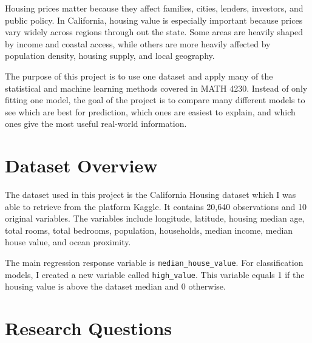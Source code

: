 \documentclass[12pt]{report}
\begin{document}
Housing prices matter because they affect families, cities, lenders, investors, and public policy. In California, housing value is especially important because prices vary widely across regions through out the state. Some areas are heavily shaped by income and coastal access, while others are more heavily affected  by population density, housing supply, and local geography.

The purpose of this project is to use one dataset and apply many of the statistical and machine learning methods covered in MATH 4230. Instead of only fitting one model, the goal of the project is to compare many different models to see which are best for prediction, which ones are easiest to explain, and which ones give the most useful real-world information.

\section{Dataset Overview}

The dataset used in this project is the California Housing dataset which I was able to retrieve from the platform Kaggle. It contains 20,640 observations and 10 original variables. The variables include longitude, latitude, housing median age, total rooms, total bedrooms, population, households, median income, median house value, and ocean proximity.

The main regression response variable is \texttt{median\_house\_value}. For classification models, I created a new variable called \texttt{high\_value}. This variable equals 1 if the housing value is above the dataset median and 0 otherwise.

\section{Research Questions}
\end{document}
